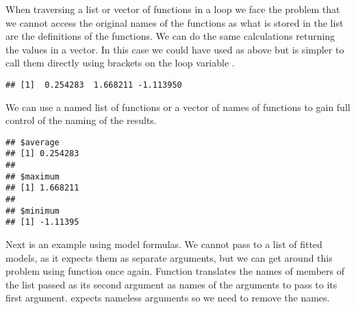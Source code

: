 \documentclass[krantz2]{krantz}\usepackage{knitr}%
\begin{document}
When traversing a list or vector of functions in a loop we face the problem that we cannot access the original names of the functions as what is stored in the list are the definitions of the functions. We can do the same calculations returning the values in a vector. In this case we could have used  as above but is simpler to call them directly using brackets on the loop variable .

\begin{knitrout}\footnotesize
{}\color{fgcolor}\begin{kframe}
\begin{alltt}
 \hlkwb{<-} \hlstd{()}
 \hlkwb{<-} 
   
    \hlkwb{<-}  
   \hlstd{\}}
\end{alltt}
\begin{verbatim}
## [1]  0.254283  1.668211 -1.113950
\end{verbatim}
\end{kframe}
\end{knitrout}

We can use a named list of functions or a vector of names of functions to gain full control of the naming of the results.

\begin{knitrout}\footnotesize
{}\color{fgcolor}\begin{kframe}
\begin{alltt}
 \hlkwb{<-} \hlstd{()}
 \hlkwb{<-} \hlstd{(}     
   
    \hlkwb{<-} 
   \hlstd{\}}
\end{alltt}
\begin{verbatim}
## $average
## [1] 0.254283
## 
## $maximum
## [1] 1.668211
## 
## $minimum
## [1] -1.11395
\end{verbatim}
\end{kframe}
\end{knitrout}

Next is an example using model formulas. We cannot pass to  a list of fitted models, as it expects them as separate arguments, but we can get around this problem using function  once again. Function  translates the names of members of the list passed as its second argument as names of the arguments to pass to its first argument.  expects nameless arguments so we need to remove the names.
\end{document}
